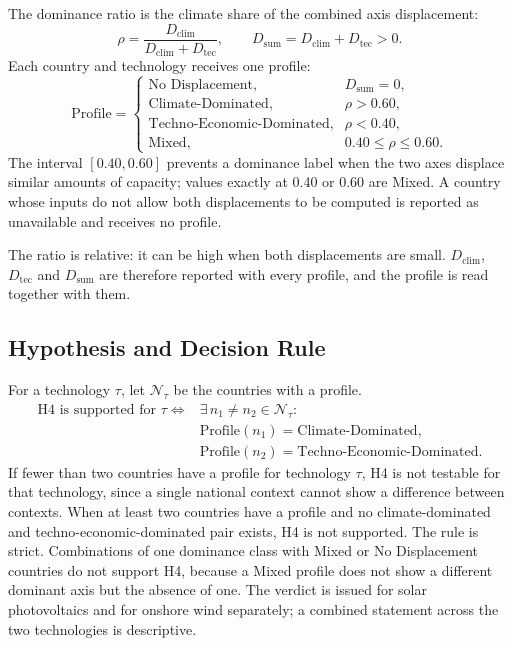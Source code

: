 The dominance ratio is the climate share of the combined axis displacement:
\begin{equation}
    \rho=\frac{D_{\mathrm{clim}}}{D_{\mathrm{clim}}+D_{\mathrm{tec}}},
    \qquad D_{\mathrm{sum}}=D_{\mathrm{clim}}+D_{\mathrm{tec}}>0 .
    \label{eq:h4_ratio}
\end{equation}
Each country and technology receives one profile:
\begin{equation}
    \mathrm{Profile}=
    \begin{cases}
        \text{No Displacement}, & D_{\mathrm{sum}}=0,\\
        \text{Climate-Dominated}, & \rho>0.60,\\
        \text{Techno-Economic-Dominated}, & \rho<0.40,\\
        \text{Mixed}, & 0.40\leq\rho\leq0.60 .
    \end{cases}
    \label{eq:h4_profile}
\end{equation}
The interval $[0.40,0.60]$ prevents a dominance label when the two axes displace
similar amounts of capacity; values exactly at 0.40 or 0.60 are Mixed. A country
whose inputs do not allow both displacements to be computed is reported as
unavailable and receives no profile.

The ratio is relative: it can be high when both displacements are small.
$D_{\mathrm{clim}}$, $D_{\mathrm{tec}}$ and $D_{\mathrm{sum}}$ are therefore
reported with every profile, and the profile is read together with them.

\subsection{Hypothesis and Decision Rule}
\label{subsec:h4_rule}

For a technology $\tau$, let $\mathcal{N}_\tau$ be the countries with a profile.
\begin{equation}
    \begin{aligned}
        \text{H4 is supported for }\tau \iff{} & \exists\, n_1\neq n_2\in\mathcal{N}_\tau:\\
        & \mathrm{Profile}(n_1)=\text{Climate-Dominated},\\
        & \mathrm{Profile}(n_2)=\text{Techno-Economic-Dominated}.
    \end{aligned}
    \label{eq:h4_rule}
\end{equation}
If fewer than two countries have a profile for technology $\tau$, H4 is not
testable for that technology, since a single national context cannot show a
difference between contexts. When at least two countries have a profile and no
climate-dominated and techno-economic-dominated pair exists, H4 is not
supported.
The rule is strict. Combinations of one dominance class with Mixed or No
Displacement countries do not support H4, because a Mixed profile does not show
a different dominant axis but the absence of one. The verdict is issued for
solar photovoltaics and for onshore wind separately; a combined statement across
the two technologies is descriptive.

